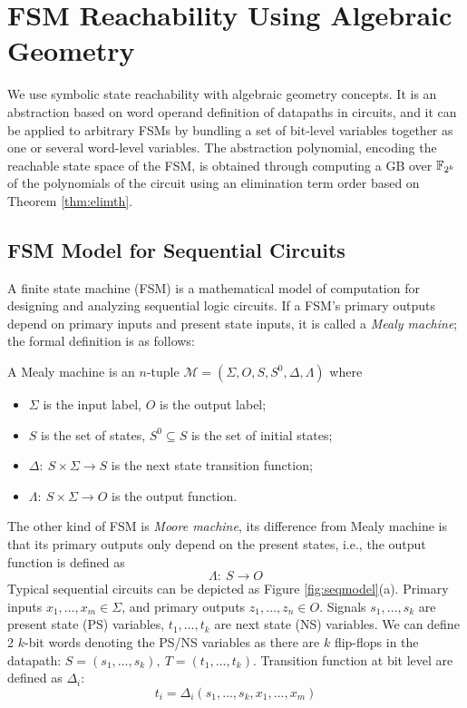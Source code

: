 \section{FSM Reachability Using Algebraic Geometry}
\label{sec:reach}
We use symbolic state reachability with algebraic
geometry concepts. It is an abstraction based on word operand
definition of datapaths in circuits, and it can be applied
to arbitrary FSMs by bundling a set of bit-level variables together as
one or several word-level variables.  The abstraction polynomial,
encoding the reachable state space of the FSM, is obtained through
computing a GB over ${\mathbb{F}}_{2^k}$ of the polynomials of the circuit using an
elimination term order based on Theorem \ref{thm:elimth}.  

\subsection{FSM Model for Sequential Circuits}
A finite state machine (FSM) is a mathematical model of computation for designing and analyzing sequential logic 
circuits. If a FSM's primary outputs depend on primary inputs and present state inputs, it is called a \textit{Mealy machine};
the formal definition is as follows:
\begin{Definition}
A Mealy machine is an $n$-tuple $\mathcal M = (\Sigma,O,S,S^0,\Delta,\Lambda)$ where
\begin{itemize}
\item $\Sigma$ is the input label, $O$ is the output label;
\item $S$ is the set of states, $S^0\subseteq S$ is the set of initial states;
\item $\Delta:\ S\times\Sigma\to S$ is the next state transition function;
\item $\Lambda:\ S\times\Sigma\to O$ is the output function.
\end{itemize}
\end{Definition}
The other kind of FSM is \textit{Moore machine}, its difference from Mealy machine is that
its primary outputs only depend on the present states, i.e., the output function is defined as
$$\Lambda:\ S \to O$$
Typical sequential circuits can be depicted as Figure \ref{fig:seqmodel}(a). Primary inputs
$x_1,\dots,x_m \in \Sigma$, and primary outputs $z_1,\dots,z_n\in O$. Signals $s_1,\dots,s_k$ 
are present state (PS) variables, $t_1,\dots,t_k$ are next state (NS) variables.
We can define 2 $k$-bit words denoting the PS/NS variables as there are $k$ flip-flops
in the datapath: $S = (s_1,\dots,s_k), ~T=(t_1,\dots,t_k)$. Transition function
at bit level are defined as $\Delta_i$: 
$$t_i = \Delta_i(s_1,\dots,s_k,x_1,\dots,x_m)$$

